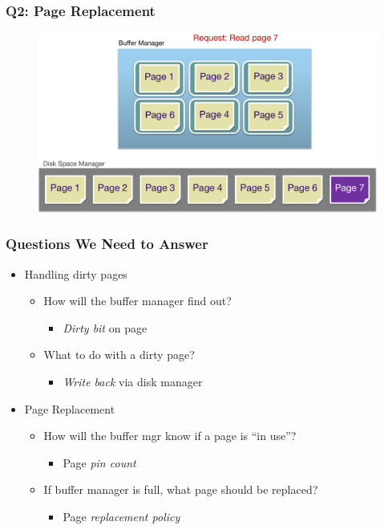 \begin{frame}[fragile]
	\frametitle{Q2: Page Replacement}
	\begin{figure}
		\includegraphics[width=.68\linewidth]{figs/dbfile-replacement.pdf}
	\end{figure}
\end{frame}

\begin{frame}[fragile]
	\frametitle{Questions We Need to Answer}
	\begin{itemize}
		\item Handling dirty pages
		\begin{itemize}
			\item How will the buffer manager find out?
			\begin{itemize}
				\item \emph{Dirty bit} on page
			\end{itemize}
			\item What to do with a dirty page?
			\begin{itemize}
				\item \emph{Write back} via disk manager
			\end{itemize}
		\end{itemize}
		\item Page Replacement
		\begin{itemize}
			\item How will the buffer mgr know if a page is “in use”?
			\begin{itemize}
				\item Page \emph{pin count}
			\end{itemize}
			\item If buffer manager is full, what page should be replaced?
			\begin{itemize}
				\item Page \emph{replacement policy}
			\end{itemize}
		\end{itemize}
	\end{itemize}
\end{frame}

